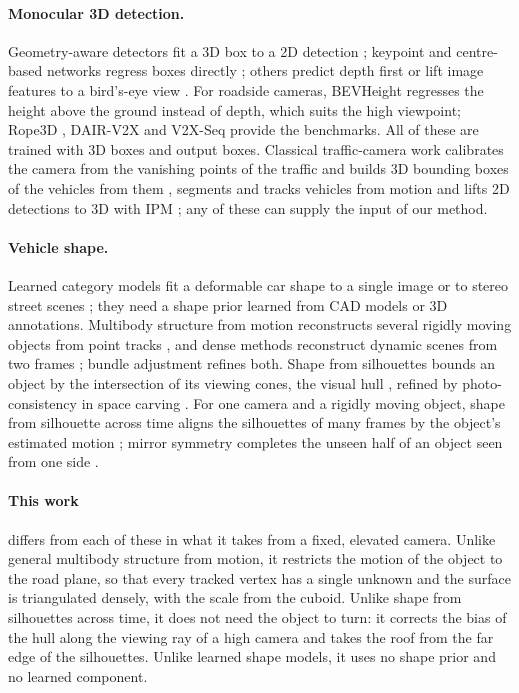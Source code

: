 \documentclass[runningheads,a4paper]{llncs}
\begin{document}
\paragraph{Monocular 3D detection.} Geometry-aware detectors fit a 3D box to a 2D detection
\cite{deep3dbox}; keypoint and centre-based networks regress boxes directly \cite{smoke,monodle,monoflex,gupnet,fcos3d};
others predict depth first \cite{pseudolidar,caddn} or lift image features to a bird's-eye view \cite{bevdet,bevdepth}.
For roadside cameras, BEVHeight \cite{bevheight} regresses the height above the ground instead of depth, which suits
the high viewpoint; Rope3D \cite{rope3d}, DAIR-V2X \cite{dairv2x} and V2X-Seq \cite{v2xseq} provide the benchmarks.
All of these are trained with 3D boxes and output boxes. Classical traffic-camera work calibrates the camera from
the vanishing points of the traffic \cite{dubska_diamond_space,dubska2015} and builds 3D bounding boxes of the vehicles
from them \cite{dubska2014,sochor}, segments and tracks vehicles from motion \cite{kanhere,moving_orig} and lifts 2D
detections to 3D with IPM \cite{mallot,lift,efficient_orig}; any of these can supply the input of our method.

\paragraph{Vehicle shape.} Learned category models fit a deformable car shape to a single image
\cite{kar2015,deepmanta,rcnn3d} or to stereo street scenes \cite{engelmann2016}; they need a shape prior learned from
CAD models or 3D annotations. Multibody structure from motion reconstructs several rigidly moving objects from point
tracks \cite{ozden2010}, and dense methods reconstruct dynamic scenes from two frames \cite{kumar2017}; bundle
adjustment \cite{bundleadj} refines both. Shape from silhouettes bounds an object by the intersection of its viewing
cones, the visual hull \cite{laurentini}, refined by photo-consistency in space carving \cite{spacecarving}. For one camera and a rigidly moving object,
shape from silhouette across time aligns the silhouettes of many frames by the object's estimated motion
\cite{cheung2005}; mirror symmetry completes the unseen half of an object seen from one side \cite{thrun2005}.

\paragraph{This work} differs from each of these in what it takes from a fixed, elevated camera. Unlike general
multibody structure from motion, it restricts the motion of the object to the road plane, so that every tracked vertex
has a single unknown and the surface is triangulated densely, with the scale from the cuboid. Unlike shape from
silhouettes across time, it does not need the object to turn: it corrects the bias of the hull along the viewing ray of
a high camera and takes the roof from the far edge of the silhouettes. Unlike learned shape models, it uses no shape
prior and no learned component.
\end{document}
